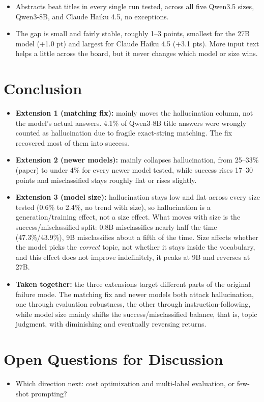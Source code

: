 \documentclass[12pt]{article}
\begin{document}
\begin{itemize}
    \item Abstracts beat titles in every single run tested, across all five Qwen3.5 sizes, Qwen3-8B, and Claude Haiku 4.5, no exceptions.
    \item The gap is small and fairly stable, roughly 1--3 points, smallest for the 27B model (+1.0 pt) and largest for Claude Haiku 4.5 (+3.1 pts). More input text helps a little across the board, but it never changes which model or size wins.
\end{itemize}

\FloatBarrier
\section{Conclusion}

\begin{itemize}
    \item \textbf{Extension 1 (matching fix):} mainly moves the hallucination column, not the model's actual answers. 4.1\% of Qwen3-8B title answers were wrongly counted as hallucination due to fragile exact-string matching. The fix recovered most of them into success. 
    \item \textbf{Extension 2 (newer models):} mainly collapses hallucination, from 25--33\% (paper) to under 4\% for every newer model tested, while success rises 17--30 points and misclassified stays roughly flat or rises slightly. 
    \item \textbf{Extension 3 (model size):} hallucination stays low and flat across every size tested (0.6\% to 2.4\%, no trend with size), so hallucination is a generation/training effect, not a size effect. What moves with size is the success/misclassified split: 0.8B misclassifies nearly half the time (47.3\%/43.9\%), 9B misclassifies about a fifth of the time. Size affects whether the model picks the \emph{correct} topic, not whether it stays inside the vocabulary, and this effect does not improve indefinitely, it peaks at 9B and reverses at 27B.
    \item \textbf{Taken together:} the three extensions target different parts of the original failure mode. The matching fix and newer models both attack hallucination, one through evaluation robustness, the other through instruction-following, while model size mainly shifts the success/misclassified balance, that is, topic judgment, with diminishing and eventually reversing returns.
\end{itemize}

\FloatBarrier
\section{Open Questions for Discussion}

\begin{itemize}
    \item Which direction next: cost optimization and multi-label evaluation, or few-shot prompting?
\end{itemize}
\end{document}
